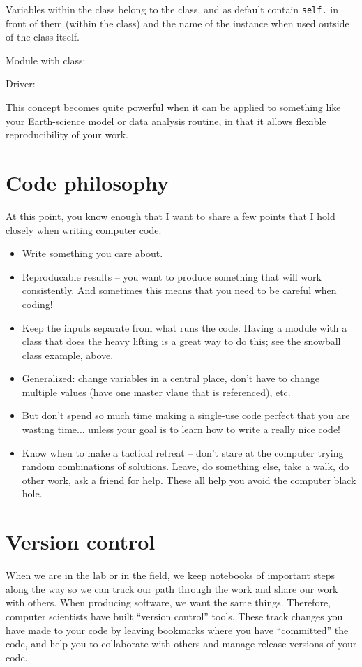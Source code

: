 \documentclass[a4paper,10pt]{scrartcl}
\begin{document}
Variables within the class belong to the class, and as default contain \lstinline{self.} in front of them (within the class) and the name of the instance when used outside of the class itself.

Module with class:


Driver:


This concept becomes quite powerful when it can be applied to something like your Earth-science model or data analysis routine, in that it allows flexible reproducibility of your work.

\section{Code philosophy}

At this point, you know enough that I want to share a few points that I hold closely when writing computer code:

\begin{itemize}
 \item Write something you care about.
 \item Reproducable results -- you want to produce something that will work consistently. And sometimes this means that you need to be careful when coding!
 \item Keep the inputs separate from what runs the code. Having a module with a class that does the heavy lifting is a great way to do this; see the snowball class example, above.
 \item Generalized: change variables in a central place, don't have to change multiple values (have one master vlaue that is referenced), etc.
 \item But don't spend so much time making a single-use code perfect that you are wasting time... unless your goal is to learn how to write a really nice code!
 \item Know when to make a tactical retreat -- don't stare at the computer trying random combinations of solutions. Leave, do something else, take a walk, do other work, ask a friend for help. These all help you avoid the computer black hole.
\end{itemize}

\section{Version control}

When we are in the lab or in the field, we keep notebooks of important steps along the way so we can track our path through the work and share our work with others. When producing software, we want the same things. Therefore, computer scientists have built ``version control'' tools. These track changes you have made to your code by leaving bookmarks where you have ``committed'' the code, and help you to collaborate with others and manage release versions of your code.
\end{document}
